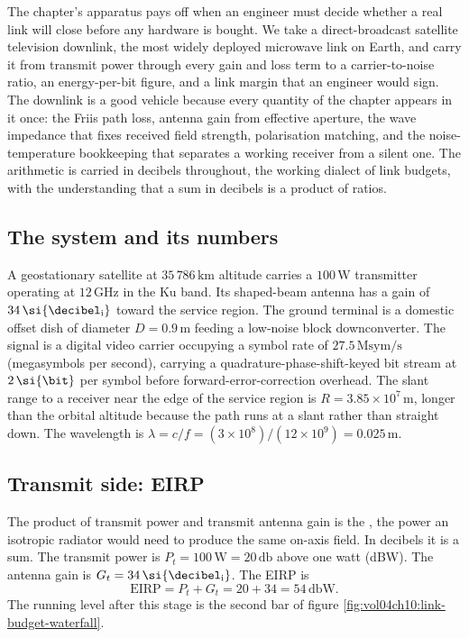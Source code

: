 The chapter's apparatus pays off when an engineer must decide whether a
real link will close before any hardware is bought. We take a
direct-broadcast satellite television downlink, the most widely deployed
microwave link on Earth, and carry it from transmit power through every
gain and loss term to a carrier-to-noise ratio, an energy-per-bit figure,
and a link margin that an engineer would sign. The downlink is a good
vehicle because every quantity of the chapter appears in it once: the
Friis path loss, antenna gain from effective aperture, the wave impedance
that fixes received field strength, polarisation matching, and the
noise-temperature bookkeeping that separates a working receiver from a
silent one. The arithmetic is carried in decibels throughout, the working
dialect of link budgets, with the understanding that a sum in decibels is
a product of ratios.

\subsection{The system and its numbers}

A geostationary satellite at $35\,786\,\si{\kilo\meter}$ altitude carries
a $100\,\si{\watt}$ transmitter operating at $12\,\si{\giga\hertz}$ in the
Ku band. Its shaped-beam antenna has a gain of $34\,\si{\decibel
\textsubscript{i}}$ toward the service region. The ground terminal is a
domestic offset dish of diameter $D = 0.9\,\si{\meter}$ feeding a
low-noise block downconverter. The signal is a digital video carrier
occupying a symbol rate of $27.5\,\text{Msym/s}$ (megasymbols per
second), carrying
a quadrature-phase-shift-keyed bit stream at $2\,\si{\bit}$ per symbol
before forward-error-correction overhead. The slant range to a receiver
near the edge of the service region is $R = 3.85\times 10^{7}\,\si{\meter}$,
longer than the orbital altitude because the path runs at a slant rather
than straight down. The wavelength is $\lambda = c/f = (3\times 10^{8})/
(12\times 10^{9}) = 0.025\,\si{\meter}$.

\subsection{Transmit side: EIRP}

The product of transmit power and transmit antenna gain is the
, the power an isotropic
radiator would need to produce the same on-axis field. In decibels it is
a sum. The transmit power is $P_{t} = 100\,\si{\watt} = 20\,\si{
\decibel}$ above one watt (dBW). The antenna gain is $G_{t} = 34\,\si{
\decibel\textsubscript{i}}$. The EIRP is
\[
\text{EIRP} = P_{t} + G_{t} = 20 + 34 = 54\,\si{\decibel}\text{W}.
\]
The running level after this stage is the second bar of figure
\ref{fig:vol04ch10:link-budget-waterfall}.

